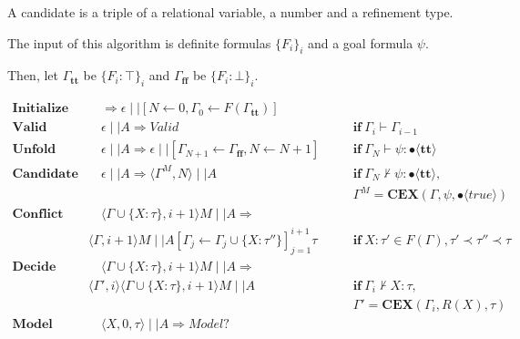 \documentclass[runningheads]{llncs}
\newcommand\COL{\mathbin{:}}
\newcommand \true {\textbf{tt}}
\newcommand \false {\textbf{ff}}
\newcommand \stypebool {\bullet}
\newcommand \typebool[1]{\stypebool \langle #1 \rangle}
\begin{document}
A candidate is a triple of a relational variable, a number and a refinement type.

The input of this algorithm is definite formulas \(\{F_i\}_i\) and a goal formula
\(\psi\).

Then, let \( \Gamma_\true \) be \( \{F_i: \top\}_i \)
and \( \Gamma_\false \) be \( \{F_i: \bot \}_i \).

\begin{align*}
    \textbf{Initialize} &\quad
        \Longrightarrow
        \epsilon \mid \mid [N \leftarrow 0, \Gamma_0 \leftarrow F(\Gamma_\true)]
        &&\\
    \textbf{Valid} &\quad
        \epsilon \mid \mid A \Longrightarrow \textit{Valid}
        &&\quad \textbf{if} \ \Gamma_{i} \vdash \Gamma_{i-1}
        \\
    \textbf{Unfold} &\quad
        \epsilon \mid \mid A \Longrightarrow
        \epsilon \mid \mid [\Gamma_{N+1} \leftarrow \Gamma_\false, N \leftarrow N + 1]
        &&\quad \textbf{if} \ \Gamma_{N} \vdash \psi: \typebool{\true}
        \\
    \textbf{Candidate} &\quad
        \epsilon \mid \mid A
        \Longrightarrow
        \langle \Gamma^M, N \rangle \mid \mid A
        && \quad \textbf{if} \ \Gamma_N \not \vdash \psi \COL
        \typebool{\true},\\
        &&&\quad \Gamma^M = \textbf{CEX}(\Gamma, \psi, \typebool{true})
        \\
    \textbf{Conflict} &\quad
        \langle \Gamma \cup \{X: \tau\}, i + 1 \rangle M\mid \mid A
        \Longrightarrow&&\\
        & \langle \Gamma, i+1 \rangle M
        \mid \mid A[\Gamma_j \leftarrow \Gamma_j \cup \{X: \tau''\}]_{j=1}^{i+1}
        \tau
        &&\quad \textbf{if} \  X: \tau' \in F(\Gamma), \tau' \prec \tau''
        \prec \tau
        \\
    \textbf{Decide} &\quad
        \langle \Gamma \cup \{X: \tau\}, i + 1 \rangle M\mid \mid A
        \Longrightarrow&&\\
        & \langle \Gamma', i \rangle \langle \Gamma \cup \{X: \tau\}, i+1 \rangle M
        \mid \mid A
        &&\quad \textbf{if} \ \Gamma_i \not\vdash X \COL \tau,\\
        &&&\quad \Gamma' = \textbf{CEX}(\Gamma_i, R(X), \tau)
        \\
    \textbf{Model} &\quad
        \langle X, 0, \tau \rangle \mid \mid A \Rightarrow Model?
        &&\\
\end{align*}
\end{document}
